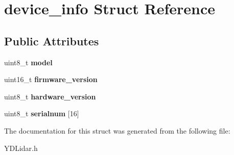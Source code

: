 \hypertarget{structdevice__info}{}\section{device\+\_\+info Struct Reference}
\label{structdevice__info}
\subsection*{Public Attributes}
\begin{DoxyCompactItemize}
\item 
uint8\+\_\+t {\bfseries model}\hypertarget{structdevice__info_a3c491b342ed11af3c70358e7e8f6c935}{}\label{structdevice__info_a3c491b342ed11af3c70358e7e8f6c935}

\item 
uint16\+\_\+t {\bfseries firmware\+\_\+version}\hypertarget{structdevice__info_af3d369a410577d85ec6b59ffeeaade48}{}\label{structdevice__info_af3d369a410577d85ec6b59ffeeaade48}

\item 
uint8\+\_\+t {\bfseries hardware\+\_\+version}\hypertarget{structdevice__info_add77e9b0edbc4a0dbd8f91b0cac9ea13}{}\label{structdevice__info_add77e9b0edbc4a0dbd8f91b0cac9ea13}

\item 
uint8\+\_\+t {\bfseries serialnum} \mbox{[}16\mbox{]}\hypertarget{structdevice__info_abf23e35480aff36d846085ca6fd0eec3}{}\label{structdevice__info_abf23e35480aff36d846085ca6fd0eec3}

\end{DoxyCompactItemize}


The documentation for this struct was generated from the following file\+:\begin{DoxyCompactItemize}
\item 
Y\+D\+Lidar.\+h\end{DoxyCompactItemize}
